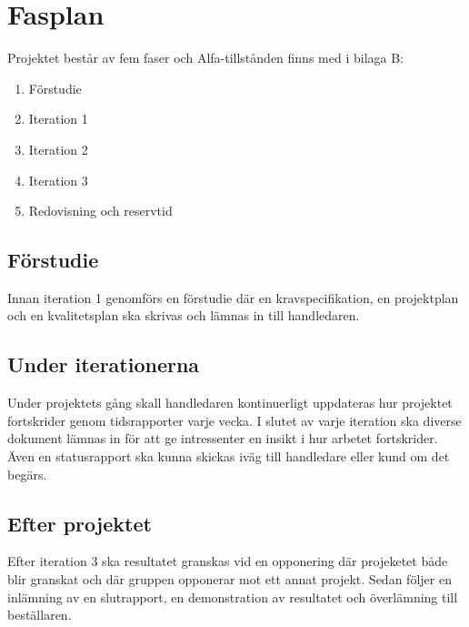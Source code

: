 \section{Fasplan}
Projektet består av fem faser och Alfa-tillstånden finns med i bilaga B:
\begin{enumerate}
\item Förstudie
\item Iteration 1
\item Iteration 2
\item Iteration 3
\item Redovisning och reservtid
\end{enumerate}

\subsection{Förstudie}
Innan iteration 1 genomförs en förstudie där en  kravspecifikation, en projektplan och en kvalitetsplan ska skrivas och lämnas in till handledaren. 

\subsection{Under iterationerna}

Under projektets gång skall handledaren kontinuerligt uppdateras hur projektet fortskrider genom tidsrapporter varje vecka. I slutet av varje iteration ska diverse dokument lämnas in för att ge intressenter en insikt i hur arbetet fortskrider. Även en statusrapport ska kunna skickas iväg till handledare eller kund om det begärs. 


\subsection{Efter projektet}
Efter iteration 3 ska resultatet granskas vid en opponering där projeketet både blir granskat och där gruppen opponerar mot ett annat projekt. Sedan följer en inlämning av en slutrapport, en demonstration av resultatet och överlämning till beställaren. 
